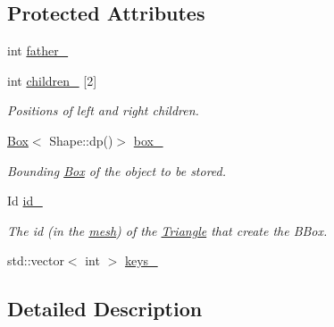 \subsection*{Protected Attributes}
\begin{DoxyCompactItemize}
\item 
int \hyperlink{classTreeNode_a95f8421119daf2730df4905bd97f697d}{father\_\-}
\item 
\hypertarget{classTreeNode_a5b6fa7cabe1fd491fe31256fc6429c63}{
int \hyperlink{classTreeNode_a5b6fa7cabe1fd491fe31256fc6429c63}{children\_\-} \mbox{[}2\mbox{]}}
\label{classTreeNode_a5b6fa7cabe1fd491fe31256fc6429c63}

\begin{DoxyCompactList}\small\item\em Positions of left and right children. \item\end{DoxyCompactList}\item 
\hypertarget{classTreeNode_a44681fa0bcf07bec8b5216cb19157784}{
\hyperlink{classBox}{Box}$<$ Shape::dp()$>$ \hyperlink{classTreeNode_a44681fa0bcf07bec8b5216cb19157784}{box\_\-}}
\label{classTreeNode_a44681fa0bcf07bec8b5216cb19157784}

\begin{DoxyCompactList}\small\item\em Bounding \hyperlink{classBox}{Box} of the object to be stored. \item\end{DoxyCompactList}\item 
\hypertarget{classTreeNode_ad01c8a279dacb70598a5fd0f7745eae3}{
Id \hyperlink{classTreeNode_ad01c8a279dacb70598a5fd0f7745eae3}{id\_\-}}
\label{classTreeNode_ad01c8a279dacb70598a5fd0f7745eae3}

\begin{DoxyCompactList}\small\item\em The id (in the \hyperlink{structmesh}{mesh}) of the \hyperlink{classTriangle}{Triangle} that create the BBox. \item\end{DoxyCompactList}\item 
std::vector$<$ int $>$ \hyperlink{classTreeNode_af184af7ec1a760f9928a9cc7a76a8395}{keys\_\-}
\end{DoxyCompactItemize}


\subsection{Detailed Description}
